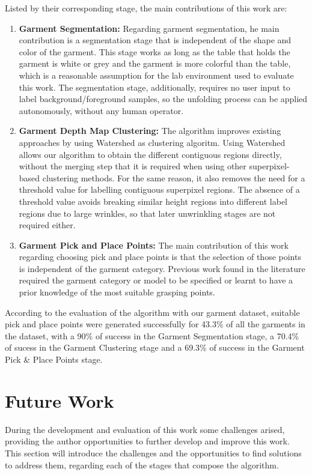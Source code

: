 Listed by their corresponding stage, the main contributions of this work are:
\begin{enumerate}
	\item \textbf{Garment Segmentation:} Regarding garment segmentation, he main contribution is a segmentation stage that is independent of the shape and color of the garment. This stage works as long as the table that holds the garment is white or grey and the garment is more colorful than the table, which is a reasonable assumption for the lab environment used to evaluate this work. The segmentation stage, additionally, requires no user input to label background/foreground samples, so the unfolding process can be applied autonomously, without any human operator.
	\item \textbf{Garment Depth Map Clustering:} The algorithm improves existing approaches by using Watershed as clustering algoritm. Using Watershed allows our algorithm to obtain the different contiguous regions directly, without the merging step that it is required when using other superpixel-based clustering methods. For the same reason, it also removes the need for a threshold value for labelling contiguous superpixel regions. The absence of a threshold value avoids breaking similar height regions into different label regions due to large wrinkles, so that later unwrinkling stages are not required either. 
	\item \textbf{Garment Pick and Place Points:} The main contribution of this work regarding choosing pick and place points is that the selection of those points is independent of the garment category. Previous work found in the literature required the garment category or model to be specified or learnt to have a prior knowledge of the most suitable grasping points.
\end{enumerate}

According to the evaluation of the algorithm with our garment dataset, suitable pick and place points were generated successfully for 43.3\% of all the garments in the dataset, with a 90\% of success in the Garment Segmentation stage, a 70.4\% of sucess in the Garment Clustering stage and a 69.3\% of success in the Garment Pick \& Place Points stage.

\section{Future Work}
\label{conclusions:future_work}
During the development and evaluation of this work some challenges arised, providing the author opportunities to further develop and improve this work. This section will introduce the challenges and the opportunities to find solutions to address them, regarding each of the stages that compose the algorithm.

